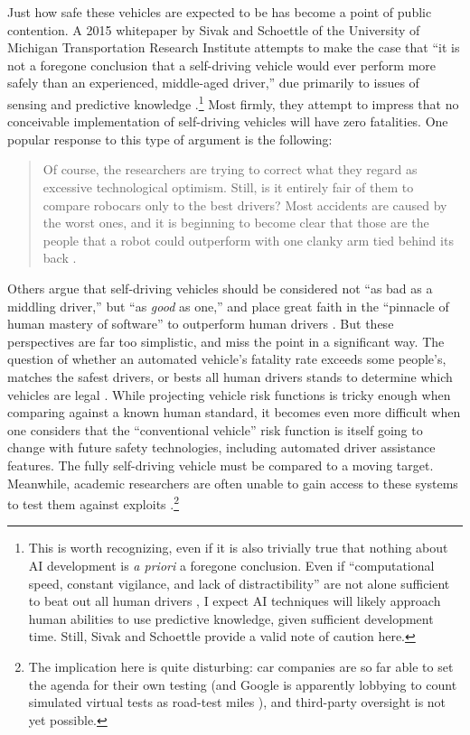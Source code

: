 Just how safe these vehicles are expected to be has become a point of
public contention. A 2015 whitepaper by Sivak and Schoettle of the
University of Michigan Transportation Research Institute attempts to
make the case that ``it is not a foregone conclusion that a
self-driving vehicle would ever perform more safely than an
experienced, middle-aged driver,'' due primarily to issues of sensing and
predictive knowledge \cite[p. 7]{SivakSchoettle}.\footnote{This is worth
recognizing, even if it is also trivially true that nothing about AI
development is \emph{a priori} a foregone conclusion. Even if
``computational speed, constant vigilance, and lack of 
distractibility'' are not alone sufficient to beat out all human
drivers \cite[p. 4]{SivakSchoettle}, I expect AI techniques will
likely approach human 
abilities to use predictive 
knowledge, given sufficient development time. Still, Sivak and
Schoettle provide a valid note of caution here.} Most firmly, they
attempt to impress that no conceivable implementation of self-driving
vehicles will have zero fatalities. One popular response to this type of
argument is the following: 
\begin{quote}Of course, the researchers are trying to correct what they regard as
excessive technological optimism. Still, is it entirely fair of them
to compare robocars only to the best drivers? Most accidents are
caused by the worst ones, and it is beginning to become clear that
those are the people that a robot could outperform with one clanky
arm tied behind its back \cite{rossSafety}.\end{quote} 
Others argue that self-driving vehicles should be considered not ``as
bad as a middling 
driver,'' but ``as \emph{good} as one,'' and place great faith in the
``pinnacle of human mastery of software'' to outperform human drivers \cite{templetonB}.
But these perspectives are far too simplistic, and miss the point in a
significant way. The question of whether an
automated vehicle's fatality rate exceeds some people's, matches the
safest drivers, or bests all human drivers stands to determine which
vehicles are legal \cite[p. 6]{SivakSchoettle}. While projecting vehicle
risk functions is tricky enough when comparing against a known human
standard, it becomes even more difficult when one considers that the
``conventional vehicle'' risk function is itself going to change with
future safety technologies, including automated driver assistance
features. The fully self-driving vehicle must be compared to a moving
target. Meanwhile, academic researchers are often unable to gain access to
these systems to test them against exploits
\cite{madrigalHack}.\footnote{The
implication here is quite disturbing: car companies are so far able to
set the agenda for their own testing (and Google is apparently
lobbying to count simulated virtual tests as road-test miles
\cite{harrisVirtual}),
and third-party oversight is not yet possible.}

